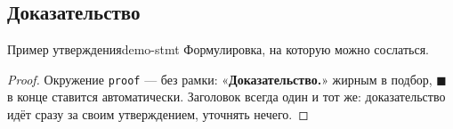 \subsection{Доказательство}

\begin{Statement}{Пример утверждения}{demo-stmt}
	Формулировка, на которую можно сослаться.
\end{Statement}

\begin{proof}
	Окружение \verb|proof| — без рамки: «\textbf{Доказательство.}» жирным
	в подбор, $\blacksquare$ в конце ставится автоматически.
	Заголовок всегда один и тот же: доказательство идёт сразу за своим
	утверждением, уточнять нечего.
\end{proof}
